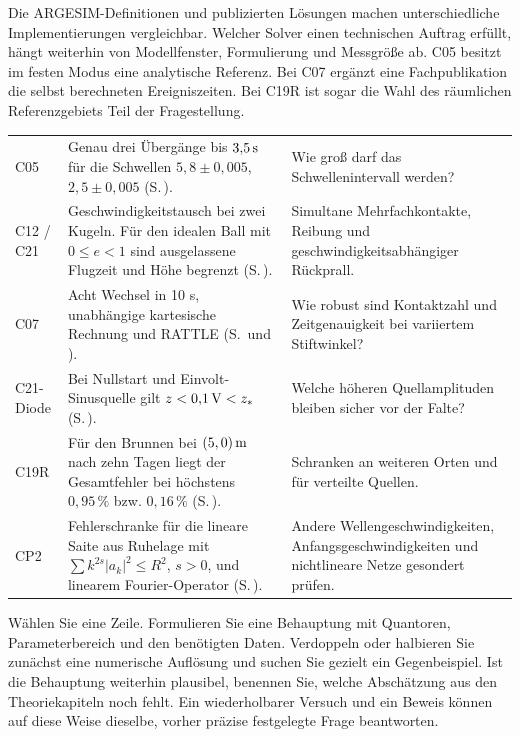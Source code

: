 Die ARGESIM-Definitionen und publizierten Lösungen machen unterschiedliche Implementierungen vergleichbar. Welcher Solver einen technischen Auftrag erfüllt, hängt weiterhin von Modellfenster, Formulierung und Messgröße ab. C05 besitzt im festen Modus eine analytische Referenz. Bei C07 ergänzt eine Fachpublikation die selbst berechneten Ereigniszeiten. Bei C19R ist sogar die Wahl des räumlichen Referenzgebiets Teil der Fragestellung.
{\tblstart\begin{tabularx}{\linewidth}{@{}P{23mm}YY@{}}\toprule
{}&&\\\midrule
C05&Genau drei Übergänge bis \(3{,}5\,\mathrm{s}\) für die Schwellen \(5{,}8\pm0{,}005\), \(2{,}5\pm0{,}005\) (S.\,).&Wie groß darf das Schwellenintervall werden?\\
C12 / C21&Geschwindigkeitstausch bei zwei Kugeln. Für den idealen Ball mit \(0\le e<1\) sind ausgelassene Flugzeit und Höhe begrenzt (S.\,).&Simultane Mehrfachkontakte, Reibung und geschwindigkeitsabhängiger Rückprall.\\
C07&Acht Wechsel in 10 s, unabhängige kartesische Rechnung und RATTLE (S.\, und ).&Wie robust sind Kontaktzahl und Zeitgenauigkeit bei variiertem Stiftwinkel?\\
C21-Diode&Bei Nullstart und Einvolt-Sinusquelle gilt \(z<0{,}1\,\mathrm{V}<z_*\) (S.\,).&Welche höheren Quellamplituden bleiben sicher vor der Falte?\\
C19R&Für den Brunnen bei \((5,0)\,\mathrm{m}\) nach zehn Tagen liegt der Gesamtfehler bei höchstens \(0{,}95\,\%\) bzw. \(0{,}16\,\%\) (S.\,).&Schranken an weiteren Orten und für verteilte Quellen.\\
CP2&Fehlerschranke für die lineare Saite aus Ruhelage mit \(\sum k^{2s}|a_k|^2\le R^2\), \(s>0\), und linearem Fourier-Operator (S.\,).&Andere Wellengeschwindigkeiten, Anfangsgeschwindigkeiten und nichtlineare Netze gesondert prüfen.\\\bottomrule\end{tabularx}\par}
Wählen Sie eine Zeile. Formulieren Sie eine Behauptung mit Quantoren, Parameterbereich und den benötigten Daten. Verdoppeln oder halbieren Sie zunächst eine numerische Auflösung und suchen Sie gezielt ein Gegenbeispiel. Ist die Behauptung weiterhin plausibel, benennen Sie, welche Abschätzung aus den Theoriekapiteln noch fehlt. Ein wiederholbarer Versuch und ein Beweis können auf diese Weise dieselbe, vorher präzise festgelegte Frage beantworten.
